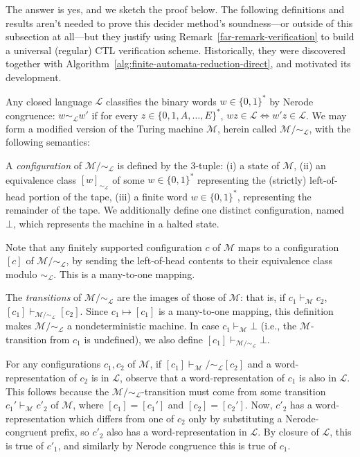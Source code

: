 The answer is yes, and we sketch the proof below.
The following definitions and results aren't needed to prove this decider method's soundness---or outside of this subsection at all---but they justify using Remark~\ref{far-remark-verification} to build a universal (regular) CTL verification scheme.
Historically, they were discovered together with Algorithm~\ref{alg:finite-automata-reduction-direct}, and motivated its development.

Any closed language $\mathcal{L}$ classifies the binary words $w\in\{0,1\}^*$ by Nerode congruence: $w\sim_\mathcal{L} w'$ if for every $z\in\{0,1,A,\ldots,E\}^*$, $wz\in\mathcal{L}\iff w'z\in\mathcal{L}$.
We may form a modified version of the Turing machine $\mathcal{M}$, herein called $\mathcal{M}/\sim_\mathcal{L}$, with the following semantics:

A \textit{configuration} of $\mathcal{M}/\sim_\mathcal{L}$ is defined by the 3-tuple: (i) a state of $\mathcal{M}$, (ii) an equivalence class $[w]_{\sim_\mathcal{L}}$ of some $w\in\{0,1\}^*$ representing the (strictly) left-of-head portion of the tape,  (iii) a finite word $w\in\{0,1\}^*$, representing the remainder of the tape.
We additionally define one distinct configuration, named $\bot$, which represents the machine in a halted state.

Note that any finitely supported configuration $c$ of $\mathcal{M}$ maps to a configuration $[c]$ of $\mathcal{M}/\sim_{\mathcal{L}}$, by sending the left-of-head contents to their equivalence class modulo $\sim_\mathcal{L}$.
This is a many-to-one mapping.

The \emph{transitions} of $\mathcal{M}/\sim_{\mathcal{L}}$ are the images of those of $\mathcal{M}$: that is, if $c_1\vdash_\mathcal{M} c_2$, $[c_1]\vdash_{\mathcal{M}/\sim_\mathcal{L}} [c_2]$. Since $c_1\mapsto[c_1]$ is a many-to-one mapping, this definition makes $\mathcal{M}/\sim_\mathcal{L}$ a nondeterministic machine.
In case $c_1\vdash_\mathcal{M}\bot$ (i.e., the $\mathcal{M}$-transition from $c_1$ is undefined), we also define $[c_1]\vdash_{\mathcal{M}/\sim_\mathcal{L}}\bot$.

For any configurations $c_1,c_2$ of $\mathcal{M}$, if $[c_1]\vdash_\mathcal{M}/\sim_\mathcal{L} [c_2]$ and a word-representation of $c_2$ is in $\mathcal{L}$, observe that a word-representation of $c_1$ is also in $\mathcal{L}$.
This follows because the $\mathcal{M}/\sim_\mathcal{L}$-transition must come from some transition $c_1'\vdash_\mathcal{M}c'_2$ of $\mathcal{M}$, where $[c_1]=[c_1']$ and $[c_2]=[c_2']$. Now, $c'_2$ has a word-representation which differs from one of $c_2$ only by substituting a Nerode-congruent prefix, so $c'_2$ also has a word-representation in $\mathcal{L}$. By closure of $\mathcal{L}$, this is true of $c'_1$, and similarly by Nerode congruence this is true of $c_1$.

